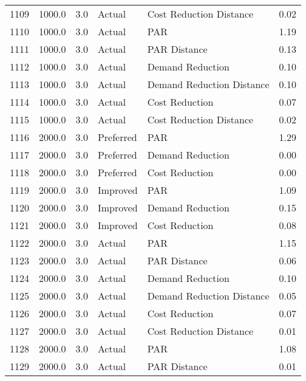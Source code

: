 \begin{longtable}{lrrllr}
1109 &       1000.0 &     3.0 &         Actual &    Cost Reduction Distance &   0.02 \\
1110 &       1000.0 &     3.0 &         Actual &                        PAR &   1.19 \\
1111 &       1000.0 &     3.0 &         Actual &               PAR Distance &   0.13 \\
1112 &       1000.0 &     3.0 &         Actual &           Demand Reduction &   0.10 \\
1113 &       1000.0 &     3.0 &         Actual &  Demand Reduction Distance &   0.10 \\
1114 &       1000.0 &     3.0 &         Actual &             Cost Reduction &   0.07 \\
1115 &       1000.0 &     3.0 &         Actual &    Cost Reduction Distance &   0.02 \\
1116 &       2000.0 &     3.0 &      Preferred &                        PAR &   1.29 \\
1117 &       2000.0 &     3.0 &      Preferred &           Demand Reduction &   0.00 \\
1118 &       2000.0 &     3.0 &      Preferred &             Cost Reduction &   0.00 \\
1119 &       2000.0 &     3.0 &       Improved &                        PAR &   1.09 \\
1120 &       2000.0 &     3.0 &       Improved &           Demand Reduction &   0.15 \\
1121 &       2000.0 &     3.0 &       Improved &             Cost Reduction &   0.08 \\
1122 &       2000.0 &     3.0 &         Actual &                        PAR &   1.15 \\
1123 &       2000.0 &     3.0 &         Actual &               PAR Distance &   0.06 \\
1124 &       2000.0 &     3.0 &         Actual &           Demand Reduction &   0.10 \\
1125 &       2000.0 &     3.0 &         Actual &  Demand Reduction Distance &   0.05 \\
1126 &       2000.0 &     3.0 &         Actual &             Cost Reduction &   0.07 \\
1127 &       2000.0 &     3.0 &         Actual &    Cost Reduction Distance &   0.01 \\
1128 &       2000.0 &     3.0 &         Actual &                        PAR &   1.08 \\
1129 &       2000.0 &     3.0 &         Actual &               PAR Distance &   0.01 \\

\end{longtable}
